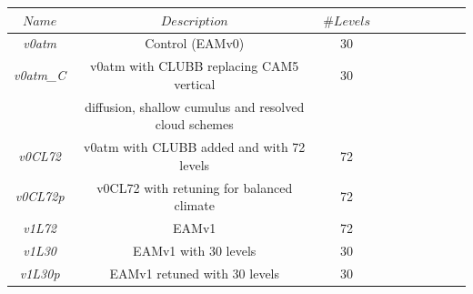 \documentclass[draft,ms]{AGUTeX}
\begin{document}
\begin{article}
\begin{table}[t]
\begin{center}
\begin{tabular}{cccccrrcrc}
\hline\hline
$Name$ & $Description$ & $\# Levels$\\
\hline
\it{v0atm}       & Control (EAMv0)                          & 30 \\
\it{v0atm\_C}    & v0atm with CLUBB replacing CAM5 vertical & 30 \\
& diffusion, shallow cumulus and resolved cloud schemes & \\
\it{v0CL72}      & v0atm with CLUBB added and with 72 levels                                            & 72 \\
\it{v0CL72p}     & v0CL72 with retuning for balanced climate                                           & 72 \\
\it{v1L72}       & EAMv1                                            & 72 \\
\it{v1L30}       & EAMv1 with 30 levels                                            & 30 \\
\it{v1L30p}      & EAMv1 retuned with 30 levels                                            & 30 \\
\hline
\end{tabular}
\end{center}
\end{table}








\end{article}
\end{document}

